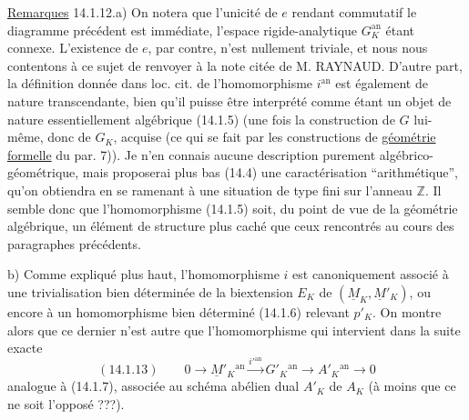 \uline{Remarques} 14.1.12.\quad a) On notera que l'unicité de $e$ rendant commutatif
le diagramme précédent est immédiate, l'espace rigide-analytique $G_K^{\mathrm{an}}$
étant connexe. L'existence de $e$, par contre, n'est nullement triviale,
et nous nous contentons à ce sujet de renvoyer à la note citée de
M. RAYNAUD. D'autre part, la définition donnée dans loc. cit. de
l'homomorphisme $i^{\mathrm{an}}$ est également de nature transcendante, bien qu'il
puisse être interprété comme étant un objet de nature essentiellement
algébrique (14.1.5) (une fois la construction de $G$ lui-même, donc de
$G_K$, acquise (ce qui se fait par les constructions de \uline{géométrie formelle}
du par. 7)). Je n'en connais aucune description purement algébrico-géométrique,
mais proposerai plus bas (14.4) une caractérisation
``arithmétique'', qu'on obtiendra en se ramenant à une situation de type
fini sur l'anneau $\mathbb Z$. Il semble donc que l'homomorphisme (14.1.5) soit,
du point de vue de la géométrie algébrique, un élément de structure
plus caché que ceux rencontrés au cours des paragraphes précédents.

b) Comme expliqué plus haut, l'homomorphisme $i$ est canoniquement
associé à une trivialisation bien déterminée de la biextension $E_K$ de
$(\underline M_K,\underline M'_K)$, ou encore à un homomorphisme bien déterminé (14.1.6) relevant $p'_K$.
On montre alors que ce dernier n'est autre que l'homomorphisme qui
intervient dans la suite exacte
\[
(14.1.13)\qquad0\longrightarrow\underline M'_K{}^{\mathrm{an}}
\xrightarrow{i'{}^{\mathrm{an}}}G'_K{}^{\mathrm{an}}\longrightarrow A'_K{}^{\mathrm{an}}\longrightarrow0
\]
analogue à (14.1.7), associée au schéma abélien dual $A'_K$ de $A_K$ (à moins
que ce ne soit l'opposé ???).
